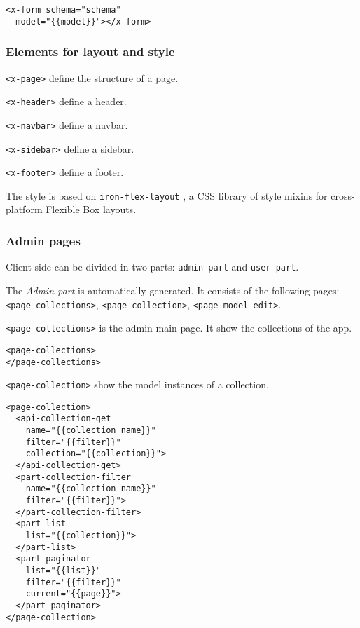 \begin{lstlisting}[language=HTML5]
<x-form schema="schema" 
  model="{{model}}"></x-form>
\end{lstlisting}

\subsubsection{Elements for layout and style}

\texttt{<x-page>} define the structure of a page.

\texttt{<x-header>} define a header.

\texttt{<x-navbar>} define a navbar.

\texttt{<x-sidebar>} define a sidebar.

\texttt{<x-footer>} define a footer.

The style is based on \texttt{iron-flex-layout} \cite{iron-elements}, a CSS library of style mixins for cross-platform Flexible Box \cite{css-flexbox} layouts.




\subsubsection{Admin pages}

Client-side can be divided in two parts: \texttt{admin part} and \texttt{user part}.

The \emph{Admin part} is automatically generated. 
It consists of the following pages: \texttt{<page-collections>}, \texttt{<page-collection>}, \texttt{<page-model-edit>}.

\texttt{<page-collections>} is the admin main page. It show the collections of the app. 

\begin{lstlisting}[language=HTML5]
<page-collections>
</page-collections>
\end{lstlisting}

\texttt{<page-collection>} show the model instances of a collection.

\begin{lstlisting}[language=HTML5]
<page-collection>
  <api-collection-get 
    name="{{collection_name}}" 
    filter="{{filter}}"
    collection="{{collection}}">
  </api-collection-get>
  <part-collection-filter 
    name="{{collection_name}}"  
    filter="{{filter}}">
  </part-collection-filter>
  <part-list 
    list="{{collection}}">
  </part-list>
  <part-paginator 
    list="{{list}}" 
    filter="{{filter}}"
    current="{{page}}">
  </part-paginator>
</page-collection>
\end{lstlisting}

